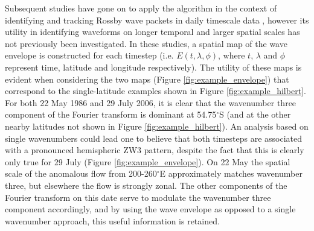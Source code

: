 Subsequent studies have gone on to apply the \citet{Zimin2003} algorithm in the context of identifying and tracking Rossby wave packets in daily timescale data \citep{Glatt2014,Souders2014a}, however its utility in identifying waveforms on longer temporal and larger spatial scales has not previously been investigated. In these studies, a spatial map of the wave envelope is constructed for each timestep (i.e. $E(t,\lambda,\phi)$, where $t$, $\lambda$ and $\phi$ represent time, latitude and longitude respectively). The utility of these maps is evident when considering the two maps (Figure \ref{fig:example_envelope}) that correspond to the single-latitude examples shown in Figure \ref{fig:example_hilbert}. For both 22 May 1986 and 29 July 2006, it is clear that the wavenumber three component of the Fourier transform is dominant at 54.75$^{\circ}$S (and at the other nearby latitudes not shown in Figure \ref{fig:example_hilbert}). An analysis based on single wavenumbers could lead one to believe that both timesteps are associated with a pronounced hemispheric ZW3 pattern, despite the fact that this is clearly only true for 29 July (Figure \ref{fig:example_envelope}). On 22 May the spatial scale of the anomalous flow from 200-260$^{\circ}$E approximately matches wavenumber three, but elsewhere the flow is strongly zonal. The other components of the Fourier transform on this date serve to modulate the wavenumber three component accordingly, and by using the wave envelope as opposed to a single wavenumber approach, this useful information is retained.